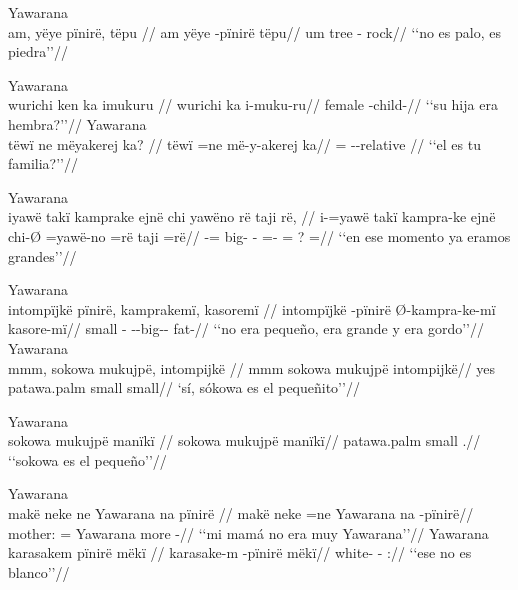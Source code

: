\documentclass{memoir}
\begin{document}
\ex Yawarana \\
\label{cat-neg-npred-pinire-nsubj}    \begingl
    \glpreamble am, yëye pïnirë, tëpu //
    \gla am yëye -pïnirë tëpu//
    \glb um tree - rock//
        \glft ‘‘no es palo, es piedra’’//  
    \endgl 
\xe

\pex\label{cat-q-npred-nsubj}    \a Yawarana\\
    \label{convfemgrme-315}        \begingl
        \glpreamble wurichi ken ka imukuru //
        \gla wurichi ka i-muku-ru//
        \glb female  -child-//
            \glft ‘‘su hija era hembra?’’//  
        \endgl 
    \a Yawarana\\
    \label{histpajirdi-278}        \begingl
        \glpreamble tëwï ne mëyakerej ka? //
        \gla tëwï =ne më-y-akerej ka//
        \glb {} = --relative //
            \glft ‘‘el es tu familia?’’//  
        \endgl 
\xe

\ex Yawarana \\
\label{perm-aff-advpred-nsubj-cop}    \begingl
    \glpreamble iyawë takï kamprake ejnë chi yawëno rë taji rë, //
    \gla i-=yawë takï kampra-ke ejnë chi-Ø =yawë-no =rë taji =rë//
    \glb {}-=  big-  - =- = ? =//
        \glft ‘‘en ese momento ya eramos grandes’’//  
    \endgl 
\xe

\pex\label{perm-aff-npred-nsubj}    \a Yawarana\\
    \label{conv1stenc-80}        \begingl
        \glpreamble intompïjkë pïnirë, kamprakemï, kasoremï //
        \gla intompïjkë -pïnirë Ø-kampra-ke-mï kasore-mï//
        \glb small - --big-- fat-//
            \glft ‘‘no era pequeño, era grande y era gordo’’//  
        \endgl 
    \a Yawarana\\
    \label{convinsectmaj-118}        \begingl
        \glpreamble mmm, sokowa mukujpë, intompijkë //
        \gla mmm sokowa mukujpë intompijkë//
        \glb yes patawa.palm small small//
            \glft ‘sí, sókowa es el pequeñito’’//  
        \endgl 
\xe

\ex Yawarana \\
\label{perm-aff-npred-nsubj-maniki}    \begingl
    \glpreamble sokowa mukujpë manïkï //
    \gla sokowa mukujpë manïkï//
    \glb patawa.palm small .//
        \glft ‘‘sokowa es el pequeño’’//  
    \endgl 
\xe

\pex\label{perm-neg-npred-pinire-nsubj}    \a Yawarana\\
    \label{descmensgrme-67}        \begingl
        \glpreamble makë neke ne Yawarana na pïnirë //
        \gla makë neke =ne Yawarana na -pïnirë//
        \glb mother:  = Yawarana more -//
            \glft ‘‘mi mamá no era muy Yawarana’’//  
        \endgl 
    \a Yawarana\\
    \label{ctovarmafl-64}        \begingl
        \glpreamble karasakem pïnirë mëkï //
        \gla karasake-m -pïnirë mëkï//
        \glb white- - ://
            \glft ‘‘ese no es blanco’’//  
        \endgl 
\xe
\end{document}
